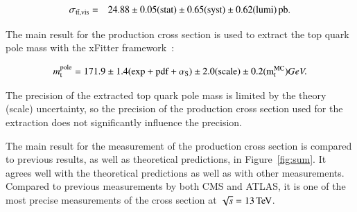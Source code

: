 \begin{eqnarray*}
\sigma_{\mathrm{t}\bar{\mathrm{t}},\mathrm{vis}} & = & 24.88 \pm 0.05({\rm stat}) \pm 0.65 ({\rm syst}) \pm 0.62({\rm lumi})\mbox{\ensuremath{\,\text{pb}}}. 
\end{eqnarray*}


The main result for the \ttbar production cross section is used to extract the top quark pole mass with the xFitter framework~\cite{Alekhin:2014irh}:

\begin{equation}
m_\mathrm{t}^{\mathrm{pole}} = 171.9 \pm 1.4 \mathrm{(exp+pdf+\alpha_\mathrm{S})} \pm 2.0 \mathrm{(scale)} \pm 0.2 \mathrm{(m_\mathrm{t}^{\mathrm{MC}})} GeV . 
\end{equation}

The precision of the extracted top quark pole mass is limited by the theory (scale) uncertainty, so the precision of the \ttbar production cross section used for the 
extraction does not significantly influence the precision. 

The main result for the measurement of the \ttbar production cross section is compared to previous results, as well as theoretical predictions, in Figure~\ref{fig:sum}.
It agrees well with the theoretical predictions as well as with other measurements. Compared to previous measurements by both CMS
and ATLAS, it is one of the most precise measurements of the \ttbar cross section at $\sqrt{s} = 13 \,\text{Te\hspace{-.08em}V}$.

